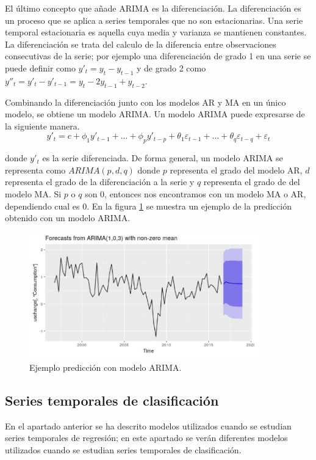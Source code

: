 El último concepto que añade ARIMA es la diferenciación. La diferenciación es un proceso que se aplica a series temporales que no son estacionarias. Una serie temporal estacionaria es aquella cuya media y varianza se mantienen constantes. La diferenciación se trata del calculo de la diferencia entre observaciones consecutivas de la serie; por ejemplo una diferenciación de grado 1 en una serie se puede definir como $ y'_t = y_t - y_{t-1}$ y de grado 2 como $y''_t = y'_t - y'_{t-1} = y_t - 2y_{t-1} + y_{t-2}$.\newline

Combinando la diferenciación junto con los modelos AR y MA en un único modelo, se obtiene un modelo ARIMA. Un modelo ARIMA puede expresarse de la siguiente manera.
$$ y'_t = c + \phi_1 y'_{t-1} + ... + \phi_p y'_{t-p} + \theta_1 \varepsilon_{t-1} + ... + \theta_q \varepsilon_{t-q} + \varepsilon_t $$

\noindent donde $y'_t$ es la serie diferenciada. De forma general, un modelo ARIMA se representa como $ARIMA(p,d,q)$ donde $p$ representa el grado del modelo AR, $d$ representa el grado de la diferenciación a la serie y $q$ representa el grado de del modelo MA. Si $p$ o $q$ son 0, entonces nos encontramos con un modelo MA o AR, dependiendo cual es 0. En la figura \ref{fig:213} se muestra un ejemplo de la predicción obtenido con un modelo ARIMA.\newline

\begin{figure}[h]
	\centering
	\includegraphics[width=100mm]{imagenes/arima_example.png}
	\caption{Ejemplo predicción con modelo ARIMA.}
	\label{fig:213}
\end{figure}
\newpage
\subsection{Series temporales de clasificación}
En el apartado anterior se ha descrito modelos utilizados cuando se estudian series temporales de regresión; en este apartado se verán diferentes modelos utilizados cuando se estudian series temporales de clasificación.\newline

